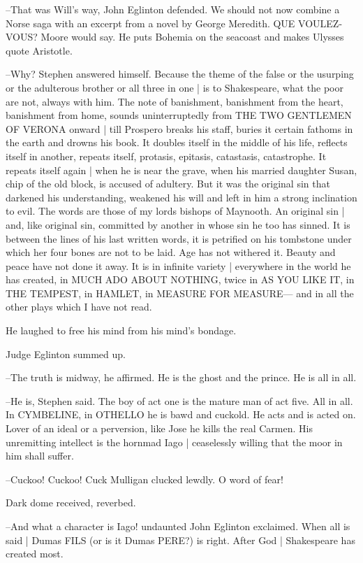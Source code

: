 --That was Will's way,
John Eglinton defended.
We should not now combine a Norse saga with an excerpt from a novel by George Meredith.
QUE VOULEZ-VOUS?
Moore would say.
He puts Bohemia on the seacoast and makes Ulysses quote Aristotle.

--Why?
Stephen answered himself.
Because the theme of the false or the usurping or the adulterous brother or all three in one |
is to Shakespeare,
what the poor are not,
always with him.
The note of banishment,
banishment from the heart,
banishment from home,
sounds uninterruptedly from THE TWO GENTLEMEN OF VERONA onward |
till Prospero breaks his staff,
buries it certain fathoms in the earth and drowns his book.
It doubles itself in the middle of his life,
reflects itself in another,
repeats itself,
protasis,
epitasis,
catastasis,
catastrophe.
It repeats itself again |
when he is near the grave,
when his married daughter Susan,
chip of the old block,
is accused of adultery.
But it was the original sin that darkened his understanding,
weakened his will and left in him a strong inclination to evil.
The words are those of my lords bishops of Maynooth.
An original sin |
and, like original sin,
committed by another in whose sin he too has sinned.
It is between the lines of his last written words,
it is petrified on his tombstone under which her four bones are not to be laid.
Age has not withered it.
Beauty and peace have not done it away.
It is in infinite variety |
everywhere in the world he has created,
in MUCH ADO ABOUT NOTHING,
twice in AS YOU LIKE IT,
in THE TEMPEST,
in HAMLET,
in MEASURE FOR MEASURE—%
and in all the other plays which I have not read.

He laughed to free his mind from his mind's bondage.

Judge Eglinton summed up.

--The truth is midway,
he affirmed.
He is the ghost and the prince.
He is all in all.

--He is,
Stephen said.
The boy of act one is the mature man of act five.
All in all.
In CYMBELINE,
in OTHELLO he is bawd and cuckold.
He acts and is acted on.
Lover of an ideal or a perversion,
like Jose he kills the real Carmen.
His unremitting intellect is the hornmad Iago |
ceaselessly willing that the moor in him shall suffer.

--Cuckoo!
Cuckoo!
Cuck Mulligan clucked lewdly.
O word of fear!

Dark dome received,
reverbed.

--And what a character is Iago!
undaunted John Eglinton exclaimed.
When all is said |
Dumas FILS (or is it Dumas PERE?) is right.
After God |
Shakespeare has created most.

